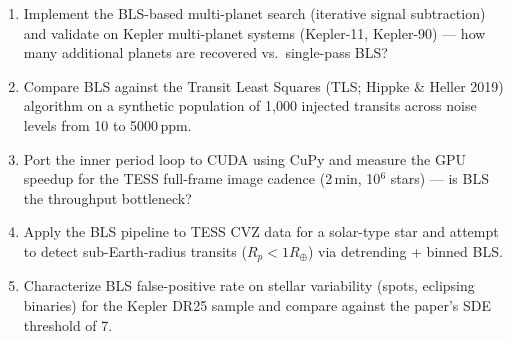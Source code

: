 \documentclass[11pt]{article}
\begin{document}
\begin{enumerate}[leftmargin=1.6em,itemsep=0.2em,topsep=0.2em,label=Q\arabic*.]
\item Implement the BLS-based multi-planet search (iterative signal subtraction) and validate on Kepler multi-planet systems (Kepler-11, Kepler-90) --- how many additional planets are recovered vs.\ single-pass BLS?
\item Compare BLS against the Transit Least Squares (TLS; Hippke \& Heller 2019) algorithm on a synthetic population of 1,000 injected transits across noise levels from 10 to 5000\,ppm.
\item Port the inner period loop to CUDA using CuPy and measure the GPU speedup for the TESS full-frame image cadence (2\,min, 10$^6$ stars) --- is BLS the throughput bottleneck?
\item Apply the BLS pipeline to TESS CVZ data for a solar-type star and attempt to detect sub-Earth-radius transits ($R_p < 1 R_\oplus$) via detrending + binned BLS.
\item Characterize BLS false-positive rate on stellar variability (spots, eclipsing binaries) for the Kepler DR25 sample and compare against the paper's SDE threshold of 7.
\end{enumerate}
\end{document}
